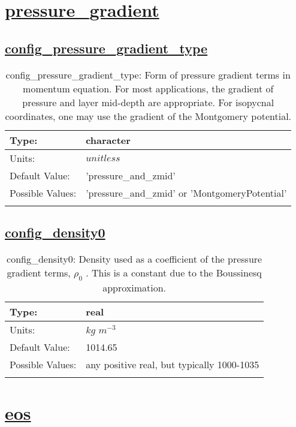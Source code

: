 \section[pressure\_gradient]{\hyperref[sec:nm_tab_pressure_gradient]{pressure\_gradient}}
\label{sec:nm_sec_pressure_gradient}
\subsection[config\_pressure\_gradient\_type]{\hyperref[sec:nm_tab_pressure_gradient]{config\_pressure\_gradient\_type}}
\label{subsec:nm_sec_config_pressure_gradient_type}
\begin{center}
\begin{longtable}{| p{2.0in} | p{4.0in} |}
    \hline
    Type: & character \\
    \hline
    Units: & $unitless$ \\
    \hline
    Default Value: & 'pressure\_and\_zmid' \\
    \hline
    Possible Values: & 'pressure\_and\_zmid' or 'MontgomeryPotential' \\
    \hline
    \caption{config\_pressure\_gradient\_type: Form of pressure gradient terms in momentum equation. For most applications, the gradient of pressure and layer mid-depth are appropriate.  For isopycnal coordinates, one may use the gradient of the Montgomery potential.}
\end{longtable}
\end{center}
\subsection[config\_density0]{\hyperref[sec:nm_tab_pressure_gradient]{config\_density0}}
\label{subsec:nm_sec_config_density0}
\begin{center}
\begin{longtable}{| p{2.0in} | p{4.0in} |}
    \hline
    Type: & real \\
    \hline
    Units: & $kg$ $m^{-3}$ \\
    \hline
    Default Value: & 1014.65 \\
    \hline
    Possible Values: & any positive real, but typically 1000-1035 \\
    \hline
    \caption{config\_density0:  Density used as a coefficient of the pressure gradient terms,  $\rho_0$ .  This is a constant due to the Boussinesq approximation.}
\end{longtable}
\end{center}
\section[eos]{\hyperref[sec:nm_tab_eos]{eos}}
\label{sec:nm_sec_eos}
